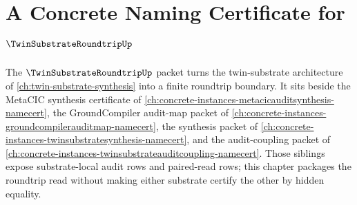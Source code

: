 \chapter{A Concrete Naming Certificate for $\TwinSubstrateRoundtripUp$}
\label{ch:concrete-instances-twinsubstrateroundtrip-namecert}

The $\TwinSubstrateRoundtripUp$ packet turns the twin-substrate architecture of \autoref{ch:twin-substrate-synthesis} into a finite roundtrip boundary. It sits beside the MetaCIC synthesis certificate of \autoref{ch:concrete-instances-metacicauditsynthesis-namecert}, the GroundCompiler audit-map packet of \autoref{ch:concrete-instances-groundcompilerauditmap-namecert}, the synthesis packet of \autoref{ch:concrete-instances-twinsubstratesynthesis-namecert}, and the audit-coupling packet of \autoref{ch:concrete-instances-twinsubstrateauditcoupling-namecert}. Those siblings expose substrate-local audit rows and paired-read rows; this chapter packages the roundtrip read without making either substrate certify the other by hidden equality.

